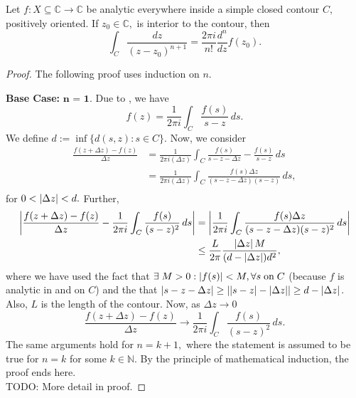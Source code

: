 \documentclass[12pt]{book}
\begin{document}
\begin{thm}
    Let $f: X \subseteq \mathbb{C} \rightarrow \mathbb{C}$ be analytic everywhere inside a simple closed contour $C,$ positively oriented. If $z_0 \in \mathbb{C},$ is interior to the contour, then
    \[
        \int_{C} \frac{dz}{(z - z_0)^{n + 1}} = \frac{2\pi i}{n!}\frac{d^{n}}{dz}f(z_{0}).
    \]
\end{thm}
\begin{proof}
    The following proof uses induction on $n.$ 

    \noindent \textbf{Base Case:} $\textbf{n = 1}.$ Due to  , we have 
    \[
        f(z) = \frac{1}{2\pi i} \int_{C} \frac{f(s)}{s - z}\,ds.
    \]
    We define $d := \inf\{ d(s, z) : s \in C\}.$ Now, we consider 
    \begin{align*}
        \frac{f(z + \Delta z) - f(z)}{\Delta z}
            &=
                \frac{1}{2\pi i (\Delta z)} \int_{C} \frac{f(s)}{s - z - \Delta z} - \frac{f(s)}{s - z}\,ds \\
            &=
                \frac{1}{2\pi i (\Delta z)} \int_{C} \frac{f(s)\Delta z}{(s - z - \Delta z) (s - z)}\,ds, \\
    \end{align*}
    for $0 < \left\lvert \Delta z \right\rvert < d.$ Further,
    \begin{align*}
        \left\lvert \frac{f(z + \Delta z) - f(z)}{\Delta z} - \frac{1}{2\pi i} \int_{C} \frac{f(s)}{(s - z)^2}\,ds \right\rvert
            &=
                \left\lvert \frac{1}{2\pi i} \int_{C} \frac{f(s) \Delta z}{(s - z - \Delta z)(s - z)^2}\,ds \right\rvert\\
            &\leq
                \frac{L}{2\pi} \frac{\left\lvert \Delta z \right\rvert M}{(d - \left\lvert \Delta z \right\rvert)d^2},
    \end{align*}
    where we have used the fact that $\exists \; M > 0: \left\lvert f(s) \right\rvert < M, \forall s \;\text{on}\; C$ (because $f$ is analytic in and on $C$) and the that $\left\lvert s - z - \Delta z \right\rvert \geq \left\lvert \left\lvert s - z \right\rvert - \left\lvert \Delta{z} \right\rvert \right\rvert \geq d - \left\lvert \Delta z \right\rvert$. Also, $L$ is the length of the contour. Now, as $\Delta z \rightarrow 0$
    \[
        \frac{f(z + \Delta z) - f(z)}{\Delta z} \rightarrow \frac{1}{2\pi i} \int_{C} \frac{f(s)}{(s - z)^2}\,ds.
    \]
    The same arguments hold for $n = k + 1,$ where the statement is assumed to be true for $n = k$ for some $k \in \mathbb{N}.$ By the principle of mathematical induction, the proof ends here. \\
    {\color{red} TODO: More detail in proof.} 
\end{proof}
\end{document}

